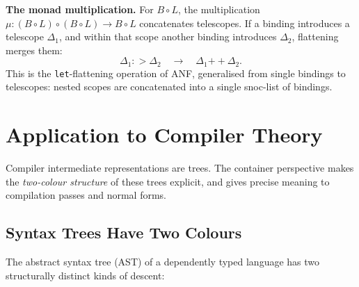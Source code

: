 \documentclass[11pt,a4paper]{article}
\theoremstyle{definition}
\theoremstyle{plain}
\begin{document}
\medskip
\noindent\textbf{The monad multiplication.}\quad
For $B \circ L$, the multiplication $\mu : (B \circ L) \circ (B \circ L)
\to B \circ L$ concatenates telescopes. If a binding introduces a
telescope $\Delta_1$, and within that scope another binding introduces
$\Delta_2$, flattening merges them:
\[
\Delta_1 \mathbin{{:}{>}} \Delta_2 \quad\longrightarrow\quad
\Delta_1 \mathbin{+\!+} \Delta_2.
\]
This is the \texttt{let}-flattening operation of ANF, generalised from
single bindings to telescopes: nested scopes are concatenated into a
single snoc-list of bindings.

\section{Application to Compiler Theory}

Compiler intermediate representations are trees. The container perspective
makes the \emph{two-colour structure} of these trees explicit, and gives
precise meaning to compilation passes and normal forms.

\subsection{Syntax Trees Have Two Colours}

The abstract syntax tree (AST) of a dependently typed language has two
structurally distinct kinds of descent:

\begin{center}
\end{center}
\end{document}
